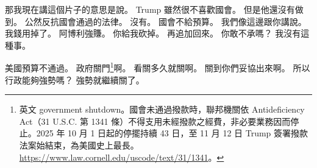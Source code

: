 \hypertarget{w01:cue:2061}{}那我現在講這個片子的意思是說。
\hypertarget{w01:cue:2062}{}Trump 雖然很不喜歡國會。
\hypertarget{w01:cue:2063}{}但是他還沒有做到。
\hypertarget{w01:cue:2064}{}公然反抗國會通過的法律。
\hypertarget{w01:cue:2065}{}沒有。
\hypertarget{w01:cue:2066}{}國會不給預算。
\hypertarget{w01:cue:2067}{}我們像這邊跟你講說。
\hypertarget{w01:cue:2068}{}我錢用掉了。
\hypertarget{w01:cue:2069}{}阿博利強賺。
\hypertarget{w01:cue:2070}{}你給我砍掉。
\hypertarget{w01:cue:2071}{}再追加回來。
\hypertarget{w01:cue:2072}{}你敢不承嗎？
\hypertarget{w01:cue:2073}{}我沒有這種事。

\hypertarget{w01:cue:2074}{}美國預算不通過。
\hypertarget{w01:cue:2075}{}政府關門\footnote{英文 government shutdown。國會未通過撥款時，聯邦機關依 Antideficiency Act（31 U.S.C. 第 1341 條）不得支用未經撥款之經費，非必要業務因而停止。2025 年 10 月 1 日起的停擺持續 43 日，至 11 月 12 日 Trump 簽署撥款法案始結束，為美國史上最長。\url{https://www.law.cornell.edu/uscode/text/31/1341}。}啊。
\hypertarget{w01:cue:2076}{}看關多久就關啊。
\hypertarget{w01:cue:2077}{}關到你們妥協出來啊。
\hypertarget{w01:cue:2078}{}所以行政能夠強勢嗎？
\hypertarget{w01:cue:2079}{}強勢就繼續關了。

